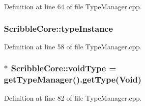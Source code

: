 Definition at line 64 of file Type\-Manager.\-cpp.

\hypertarget{namespace_scribble_core_a3e98fd779b4c6564c836206fae83a576}{
\subsubsection[{type\-Instance}]{ Scribble\-Core\-::type\-Instance}}\label{namespace_scribble_core_a3e98fd779b4c6564c836206fae83a576}


Definition at line 58 of file Type\-Manager.\-cpp.

\hypertarget{namespace_scribble_core_a19554cbcfe325fe4edc343524d8c17dc}{
\subsubsection[{void\-Type}]{$\ast$ Scribble\-Core\-::void\-Type = {\bf get\-Type\-Manager}().get\-Type({\bf Void})}}\label{namespace_scribble_core_a19554cbcfe325fe4edc343524d8c17dc}


Definition at line 82 of file Type\-Manager.\-cpp.

